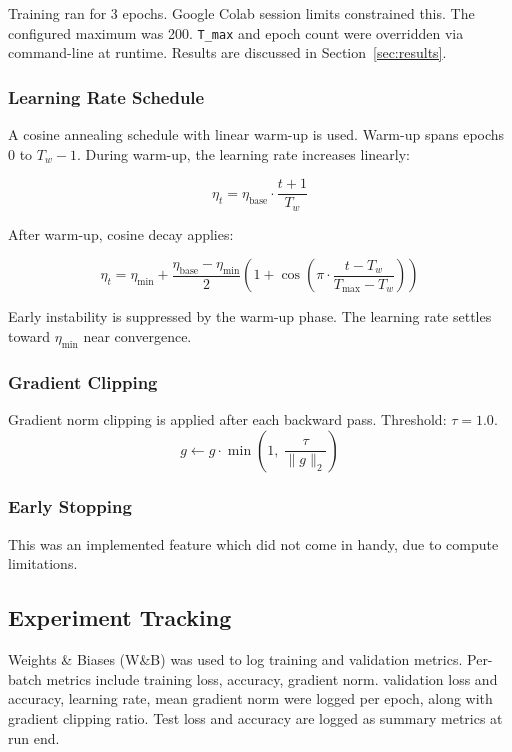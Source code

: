 Training ran for 3 epochs. Google Colab session limits constrained this. The configured maximum was 200. \texttt{T\_max} and epoch count were overridden via command-line at runtime. Results are discussed in Section~\ref{sec:results}.

\subsubsection{Learning Rate Schedule}

A cosine annealing schedule with linear warm-up is used. Warm-up spans epochs $0$ to $T_w - 1$. During warm-up, the learning rate increases linearly:

\begin{equation}
    \eta_t = \eta_{\text{base}} \cdot \frac{t+1}{T_w}
\end{equation}

After warm-up, cosine decay applies:

\begin{equation}
    \eta_t = \eta_{\min} + \frac{\eta_{\text{base}} - \eta_{\min}}{2} \left(1 + \cos\left(\pi \cdot \frac{t - T_w}{T_{\max} - T_w}\right)\right)
\end{equation}

Early instability is suppressed by the warm-up phase. The learning rate settles toward $\eta_{\min}$ near convergence.

\subsubsection{Gradient Clipping}

Gradient norm clipping is applied after each backward pass. Threshold: $\tau = 1.0$. 
\begin{equation}
    {g} \leftarrow {g} \cdot \min\!\left(1,\ \frac{\tau}{\|{g}\|_2}\right)
\end{equation}

\subsubsection{Early Stopping}
This was an implemented feature which did not come in handy, due to compute limitations.
\subsection{Experiment Tracking}
Weights \& Biases (W\&B) \cite{wandb} was used to log training and validation metrics. 
Per-batch metrics include training loss, accuracy, gradient norm. 
validation loss and accuracy, learning rate, mean gradient norm were logged per epoch, along with
gradient clipping ratio. Test loss and accuracy are logged as summary metrics at run end. 
